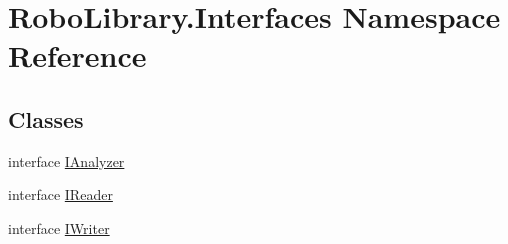 \hypertarget{namespace_robo_library_1_1_interfaces}{}\section{Robo\+Library.\+Interfaces Namespace Reference}
\label{namespace_robo_library_1_1_interfaces}
\subsection*{Classes}
\begin{DoxyCompactItemize}
\item 
interface \hyperlink{interface_robo_library_1_1_interfaces_1_1_i_analyzer}{I\+Analyzer}
\item 
interface \hyperlink{interface_robo_library_1_1_interfaces_1_1_i_reader}{I\+Reader}
\item 
interface \hyperlink{interface_robo_library_1_1_interfaces_1_1_i_writer}{I\+Writer}
\end{DoxyCompactItemize}
